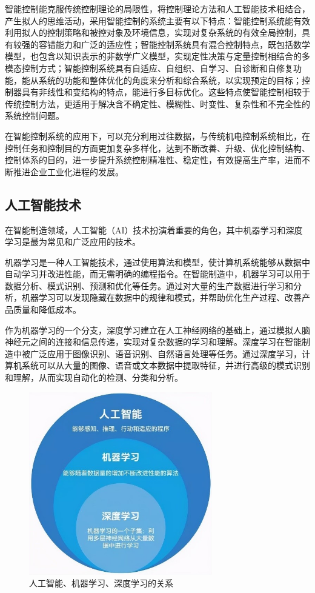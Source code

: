 \documentclass[lang=cn,12pt,bibtex,newtx,twoside,margintrue,citestyle=gb7714-2015, bibstyle=gb7714-2015]{elegantbook}
\begin{document}
智能控制能克服传统控制理论的局限性，将控制理论方法和人工智能技术相结合，产生拟人的思维活动，采用智能控制的系统主要有以下特点：智能控制系统能有效利用拟人的控制策略和被控对象及环境信息，实现对复杂系统的有效全局控制，具有较强的容错能力和广泛的适应性；智能控制系统具有混合控制特点，既包括数学模型，也包含以知识表示的非数学广义模型，实现定性决策与定量控制相结合的多模态控制方式；智能控制系统具有自适应、自组织、自学习、自诊断和自修复功能，能从系统的功能和整体优化的角度来分析和综合系统，以实现预定的目标；控制器具有非线性和变结构的特点，能进行多目标优化。这些特点使智能控制相较于传统控制方法，更适用于解决含不确定性、模糊性、时变性、复杂性和不完全性的系统控制问题。

在智能控制系统的应用下，可以充分利用过往数据，与传统机电控制系统相比，在控制任务和控制目的方面更加复杂多样化，达到不断改善、升级、优化控制结构、控制体系的目的，进一步提升系统控制精准性、稳定性，有效提高生产率，进而不断推进企业工业化进程的发展\cite{邓玲黎2023}。

\subsection{人工智能技术}
\label{sec:org9306ba6}
在智能制造领域，人工智能（AI）技术扮演着重要的角色，其中机器学习和深度学习是最为常见和广泛应用的技术。

机器学习是一种人工智能技术，通过使用算法和模型，使计算机系统能够从数据中自动学习并改进性能，而无需明确的编程指令。在智能制造中，机器学习可以用于数据分析、模式识别、预测和优化等任务。通过对大量的生产数据进行学习和分析，机器学习可以发现隐藏在数据中的规律和模式，并帮助优化生产过程、改善产品质量和降低成本。

作为机器学习的一个分支，深度学习建立在人工神经网络的基础上，通过模拟人脑神经元之间的连接和信息传递，实现对复杂数据的学习和理解。深度学习在智能制造中被广泛应用于图像识别、语音识别、自然语言处理等任务。通过深度学习，计算机系统可以从大量的图像、语音或文本数据中提取特征，并进行高级的模式识别和理解，从而实现自动化的检测、分类和分析。

\begin{figure}[htbp]
\centering
\includegraphics[angle=0,width=8cm]{./figure/2.5.jpg}
\caption{\label{2.5}人工智能、机器学习、深度学习的关系}
\end{figure}
\end{document}
